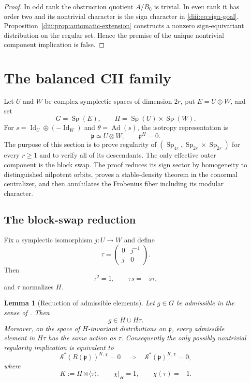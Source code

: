 \documentclass[11pt,reqno]{amsart}
\numberwithin{equation}{section}
\newtheorem{lemma}[theorem]{Lemma}
\theoremstyle{definition}
\theoremstyle{remark}
\newcommand{\Sp}{\operatorname{Sp}}
\newcommand{\Ad}{\operatorname{Ad}}
\newcommand{\Id}{\operatorname{Id}}
\newcommand{\fp}{\mathfrak p}
\newcommand{\cS}{\mathcal S}
\begin{document}
\begin{proof}
In odd rank the obstruction quotient $A/B_0$ is trivial.  In even rank it has
order two and its nontrivial character is the sign character in
\eqref{diii:eq:sign-goal}.  Proposition~\ref{diii:prop:automatic-extension}
constructs a nonzero sign-equivariant distribution on the regular set.  Hence
the premise of the unique nontrivial component implication is false.
\end{proof}


\section{The balanced CII family}\label{sec:CII-family}

Let $U$ and $W$ be complex symplectic spaces of dimension $2r$, put
$E=U\oplus W$, and set
\[
 G=\Sp(E),\qquad H=\Sp(U)\times\Sp(W).
\]
For $s=\Id_U\oplus(-\Id_W)$ and $\theta=\Ad(s)$, the isotropy representation is
\[
 \fp\simeq U\otimes W,
 \qquad \fp^H=0.
\]
The purpose of this section is to prove regularity of
$(\Sp_{4r},\Sp_{2r}\times\Sp_{2r})$ for every $r\ge1$ and to verify all of its
descendants.  The only effective outer component is the block swap.  The proof
reduces its sign sector by homogeneity to distinguished nilpotent orbits, proves
a stable-density theorem in the conormal centralizer, and then annihilates the
Frobenius fiber including its modular character.

\subsection{The block-swap reduction}
Fix a symplectic isomorphism \(j:U\to W\) and define
\[
\tau=
\begin{pmatrix}
0&j^{-1}\\
j&0
\end{pmatrix}.
\]
Then
\[
\tau^2=1,\qquad \tau s=-s\tau,
\]
and \(\tau\) normalizes \(H\).

\begin{lemma}[Reduction of admissible elements]\label{cii:lem:admissible-components}
Let \(g\in G\) be admissible in the sense of
\cite[Definition~7.4.1]{AG09}.  Then
\[
g\in H\cup H\tau.
\]
Moreover, on the space of \(H\)-invariant distributions on \(\mathfrak p\),
every admissible element in \(H\tau\) has the same action as \(\tau\).
Consequently the only possibly nontrivial regularity implication is
equivalent to
\[
\cS^*(R(\mathfrak p))^{K,\chi}=0
\quad\Longrightarrow\quad
\cS^*(\mathfrak p)^{K,\chi}=0,
\]
where
\[
K:=H\rtimes\langle\tau\rangle,
\qquad
\chi|_H=1,\qquad
\chi(\tau)=-1.
\]
\end{lemma}
\end{document}
